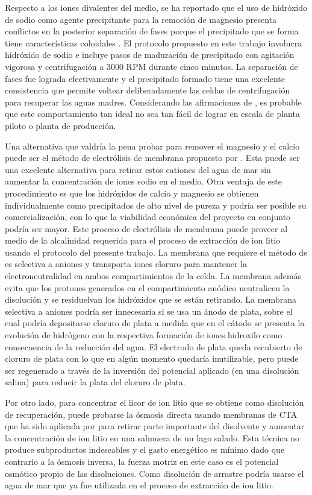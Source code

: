 Respecto a los iones divalentes del medio, se ha reportado que el uso de hidróxido de sodio como agente precipitante para la remoción de magnesio presenta conflictos en la posterior separación de fases porque el precipitado que se forma tiene características coloidales \citep{An2012}. El protocolo propuesto en este trabajo involucra hidróxido de sodio e incluye pasos de maduración de precipitado con agitación vigorosa y centrifugación a 3000 \ac{RPM} durante cinco minutos. La separación de fases fue lograda efectivamente y el precipitado formado tiene una excelente consistencia que permite voltear deliberadamente las celdas de centrifugación para recuperar las aguas madres. Considerando las afirmaciones de \citet{An2012}, es probable que este comportamiento tan ideal no sea tan fácil de lograr en escala de planta piloto o planta de producción. 

Una alternativa que valdría la pena probar para remover el magnesio y el calcio puede ser el método de electrólisis de membrana propuesto por \citet{Diaz2019}. Esta puede ser una excelente alternativa para retirar estos cationes del agua de mar sin aumentar la concentración de iones sodio en el medio. Otra ventaja de este procedimiento es que los hidróxidos de calcio y magnesio se obtienen individualmente como precipitados de alto nivel de pureza y podría ser posible su comercialización, con lo que la viabilidad económica del proyecto en conjunto podría ser mayor. Este proceso de electrólisis de membrana puede proveer al medio de la alcalinidad requerida para el proceso de extracción de ion litio usando el protocolo del presente trabajo. La membrana que requiere el método de \citet{Diaz2019} es selectiva a aniones y transporta iones cloruro para mantener la electroneutralidad en ambos compartimientos de la celda. La membrana además evita que los protones generados en el compartimiento anódico neutralicen la disolución y se residuelvan los hidróxidos que se están retirando. La membrana selectiva a aniones podría ser innecesaria si se usa un ánodo de plata, sobre el cual podría depositarse cloruro de plata a medida que en el cátodo se presenta la evolución de hidrógeno con la respectiva formación de iones hidroxilo como consecuencia de la reducción del agua. El electrodo de plata queda recubierto de cloruro de plata con lo que en algún momento quedaría inutilizable, pero puede ser regenerado a través de la inversión del potencial aplicado (en una disolución salina) para reducir la plata del cloruro de plata.

Por otro lado, para concentrar el licor de ion litio que se obtiene como disolución de recuperación, puede probarse la ósmosis directa usando membranas de \ac{CTA} que ha sido aplicada por \citet{Li2018} para retirar parte importante del disolvente y aumentar la concentración de ion litio en una salmuera de un lago salado. Esta técnica no produce subproductos indeseables y el gasto energético es mínimo dado que contrario a la ósmosis inversa, la fuerza motriz en este caso es el potencial osmótico propio de las disoluciones. Como disolución de arrastre podría usarse el agua de mar que ya fue utilizada en el proceso de extracción de ion litio. 

